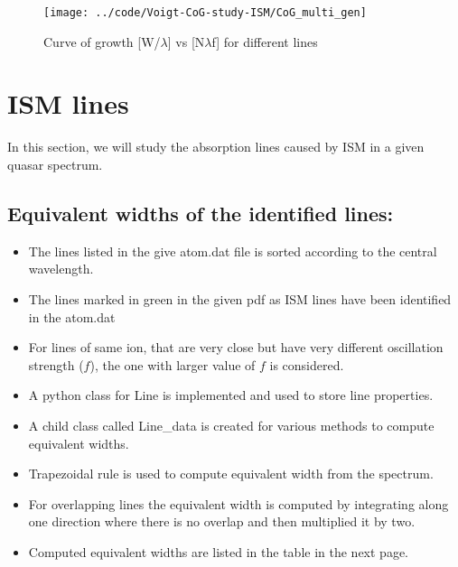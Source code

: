 \documentclass[12pt]{article}
\begin{document}
\begin{figure}[H]
	\centering
	\texttt{[image: ../code/Voigt-CoG-study-ISM/CoG\_multi\_gen]}
	\caption{Curve of growth [W/$\lambda$] vs [N$\lambda$f] for different lines}
	\label{fig:cog_multi_gen}
\end{figure}




 

 
 
 
\newpage
 
\section{ISM lines}
In this section, we will study the absorption lines caused by ISM in a given quasar spectrum.

\subsection{Equivalent widths of the identified lines:}
\begin{itemize}
\item {The lines listed in the give atom.dat file is sorted according to the central wavelength.}
\item{The lines marked in green in the given pdf as ISM lines have been identified in the atom.dat}
\item{For lines of same ion, that are very close but have very different oscillation strength ($f$), the one with larger value of $f$ is considered.}
\item{A python class for Line is implemented and used to store line properties.}
\item{A child class called Line\_data is created for various methods to compute equivalent widths.}
\item{Trapezoidal  rule is used to compute equivalent width from the spectrum.}
\item{For overlapping lines the equivalent width is computed by integrating along one direction where there is no overlap and then multiplied it by two.}
\item{Computed equivalent widths are listed in the table in the next page.}%

\end{itemize}
\end{document}
